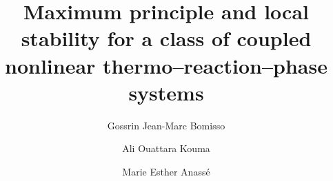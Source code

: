 \documentclass[final,1p,times]{elsarticle}
\numberwithin{equation}{section}
\begin{document}
	
	\begin{frontmatter}
		
		
		
		\title{Maximum principle and local stability for a class of coupled nonlinear thermo--reaction--phase systems} %
		
		
		
		
		\author[1]{Gossrin Jean-Marc Bomisso} 
		\author[1]{Ali Ouattara Kouma}  
		\author[1]{Marie Esther Anass\'e} 
		
		
		\address[1]{Universit\'e Nangui Abrogoua, UFR Sciences Fondamentales et Appliqu\'ees, 02 BP 801 Abidjan 02, C\^ote d'Ivoire}
		

\end{frontmatter}
\end{document}
